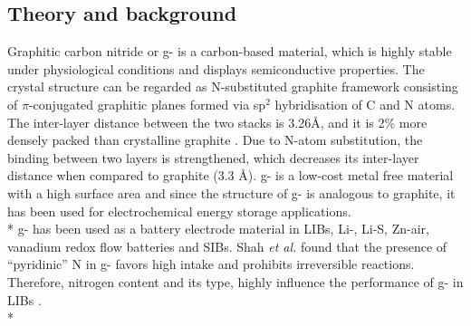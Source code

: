\subsection{Theory and background}
Graphitic carbon nitride or g- is a carbon-based material, which is highly stable under physiological conditions and displays semiconductive properties. The crystal structure can be regarded as N-substituted graphite framework consisting of $\pi$-conjugated graphitic planes formed via sp$^2$ hybridisation of C and N atoms. The inter-layer distance between the two stacks is 3.26\AA, and it is 2\% more densely packed than crystalline graphite \cite{zheng_graphitic_2012}. Due to N-atom substitution, the binding between two layers is strengthened, which decreases its inter-layer distance when compared to graphite (3.3 \AA). g- is a low-cost metal free material with a high surface area \cite{zheng_graphitic_2012} and since the structure of g- is analogous to graphite, it has been used for electrochemical energy storage applications. \\*
g- has been used as a battery electrode material in LIBs, Li-, Li-S, Zn-air, vanadium redox flow batteries and SIBs. Shah \textit{et al.} found that the presence of \enquote{pyridinic} N in g- favors high  intake and prohibits irreversible reactions. Therefore, nitrogen content and its type, highly influence the performance of g- in LIBs \cite{shah_highly_2017}. \\*
